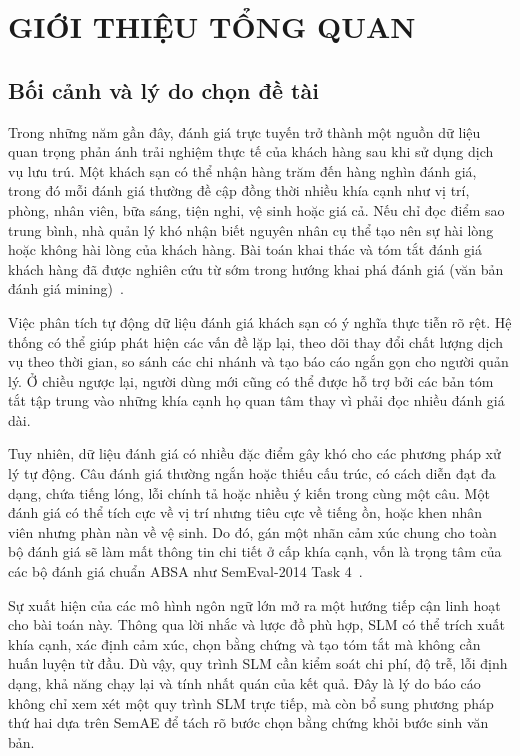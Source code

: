 \chapter{GIỚI THIỆU TỔNG QUAN}

\section{Bối cảnh và lý do chọn đề tài}

Trong những năm gần đây, đánh giá trực tuyến trở thành một nguồn dữ liệu quan trọng phản ánh trải nghiệm thực tế của khách hàng sau khi sử dụng dịch vụ lưu trú. Một khách sạn có thể nhận hàng trăm đến hàng nghìn đánh giá, trong đó mỗi đánh giá thường đề cập đồng thời nhiều khía cạnh như vị trí, phòng, nhân viên, bữa sáng, tiện nghi, vệ sinh hoặc giá cả. Nếu chỉ đọc điểm sao trung bình, nhà quản lý khó nhận biết nguyên nhân cụ thể tạo nên sự hài lòng hoặc không hài lòng của khách hàng. Bài toán khai thác và tóm tắt đánh giá khách hàng đã được nghiên cứu từ sớm trong hướng khai phá đánh giá (văn bản đánh giá mining)~\cite{hu2004mining}.

Việc phân tích tự động dữ liệu đánh giá khách sạn có ý nghĩa thực tiễn rõ rệt. Hệ thống có thể giúp phát hiện các vấn đề lặp lại, theo dõi thay đổi chất lượng dịch vụ theo thời gian, so sánh các chi nhánh và tạo báo cáo ngắn gọn cho người quản lý. Ở chiều ngược lại, người dùng mới cũng có thể được hỗ trợ bởi các bản tóm tắt tập trung vào những khía cạnh họ quan tâm thay vì phải đọc nhiều đánh giá dài.

Tuy nhiên, dữ liệu đánh giá có nhiều đặc điểm gây khó cho các phương pháp xử lý tự động. Câu đánh giá thường ngắn hoặc thiếu cấu trúc, có cách diễn đạt đa dạng, chứa tiếng lóng, lỗi chính tả hoặc nhiều ý kiến trong cùng một câu. Một đánh giá có thể tích cực về vị trí nhưng tiêu cực về tiếng ồn, hoặc khen nhân viên nhưng phàn nàn về vệ sinh. Do đó, gán một nhãn cảm xúc chung cho toàn bộ đánh giá sẽ làm mất thông tin chi tiết ở cấp khía cạnh, vốn là trọng tâm của các bộ đánh giá chuẩn ABSA như SemEval-2014 Task 4~\cite{pontiki2014semeval}.

Sự xuất hiện của các mô hình ngôn ngữ lớn mở ra một hướng tiếp cận linh hoạt cho bài toán này. Thông qua lời nhắc và lược đồ phù hợp, SLM có thể trích xuất khía cạnh, xác định cảm xúc, chọn bằng chứng và tạo tóm tắt mà không cần huấn luyện từ đầu. Dù vậy, quy trình SLM cần kiểm soát chi phí, độ trễ, lỗi định dạng, khả năng chạy lại và tính nhất quán của kết quả. Đây là lý do báo cáo không chỉ xem xét một quy trình SLM trực tiếp, mà còn bổ sung phương pháp thứ hai dựa trên SemAE để tách rõ bước chọn bằng chứng khỏi bước sinh văn bản.

